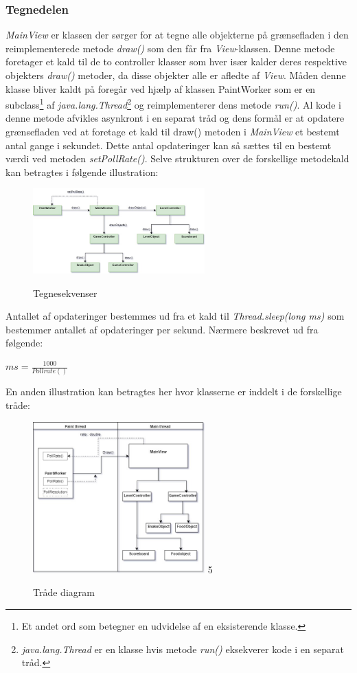 \documentclass[]{article}
\begin{document}
	\subsubsection{Tegnedelen}
	
	\textit{MainView} er klassen der sørger for at  tegne alle objekterne på grænsefladen i den reimplementerede metode \textit{draw()} som den får fra \textit{View}-klassen. Denne metode foretager et kald til de to controller klasser som hver især kalder deres respektive objekters \textit{draw()} metoder, da disse objekter alle er afledte af \textit{View}. Måden denne klasse bliver kaldt på foregår ved hjælp af klassen PaintWorker som er en subclass\footnote{Et andet ord som betegner en udvidelse af en eksisterende klasse.} af \textit{java.lang.Thread}\footnote{\textit{java.lang.Thread} er en klasse hvis metode \textit{run()} eksekverer kode i en separat tråd.}  og reimplementerer dens metode \textit{run()}. Al kode i denne metode afvikles asynkront i en separat tråd og dens formål er at opdatere grænsefladen ved at foretage et kald til draw() metoden i \textit{MainView} et bestemt antal gange i sekundet. Dette antal opdateringer kan så sættes til en bestemt værdi ved metoden \textit{setPollRate()}. Selve strukturen over de forskellige metodekald kan betragtes i følgende illustration:
	
	\begin{figure}[h!]
		\centering
		\includegraphics[width=250px]{Draw_sequence.jpg}
		\label{fig:diagram2}
		\caption{Tegnesekvenser}
	\end{figure}
	
	Antallet af opdateringer bestemmes ud fra et kald til \textit{Thread.sleep(long ms)} som bestemmer antallet af opdateringer per sekund. Nærmere beskrevet ud fra følgende:
	
	\begin{center}
		$ ms = \frac{1000}{Pollrate()}  $
	\end{center}
	
	\pagebreak
	En anden illustration kan betragtes her hvor klasserne er inddelt i de forskellige tråde:
	
	\begin{figure}[h!]
		\centering
		\includegraphics[width=250px]{Thread_diagram.jpg}
		\label{fig:thread}5
		\caption{Tråde diagram}
	\end{figure}
	
\end{document}
